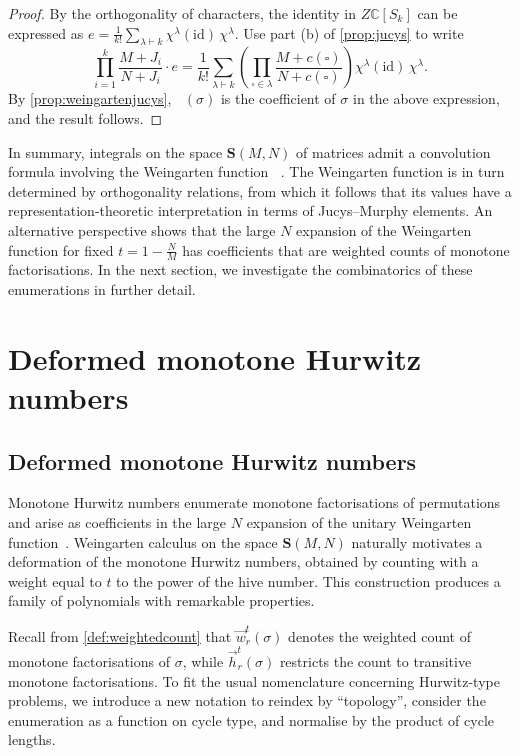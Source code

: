 \documentclass[a4paper]{article}
\theoremstyle{plain}
\numberwithin{theorem}{section}
\theoremstyle{definition}
\theoremstyle{remark}
\newcommand{\SM}{\mathbf{S}}			%
\DeclareMathOperator{\SW}{Wg^{\SM}}		%
\newcommand{\dhn}[2]{\vec{w}^{t}_{#1}(#2)}
\newcommand{\hn}[2]{\vec{h}^{t}_{#1}(#2)}
\begin{document}
\begin{proof}
By the orthogonality of characters, the identity in $Z\mathbb{C}[S_k]$ can be expressed as $e = \frac{1}{k!} \sum_{\lambda \vdash k} \chi^\lambda(\mathrm{id}) \, \chi^\lambda$. Use part (b) of \cref{prop:jucys} to write
\[
\prod_{i=1}^k \frac{M+J_i}{N+J_i} \cdot e = \frac{1}{k!} \sum_{\lambda\vdash k} \left( \prod_{\square \in \lambda} \dfrac{M + c(\square)}{N+c(\square)} \right) \chi^{\lambda}(\mathrm{id}) \, \chi^\lambda .
\]
By \cref{prop:weingartenjucys}, $\SW(\sigma)$ is the coefficient of $\sigma$ in the above expression, and the result follows.
\end{proof}


In summary, integrals on the space $\SM(M,N)$ of matrices admit a convolution formula involving the Weingarten function $\SW$. The Weingarten function is in turn determined by orthogonality relations, from which it follows that its values have a representation-theoretic interpretation in terms of Jucys--Murphy elements. An alternative perspective shows that the large $N$ expansion of the Weingarten function for fixed $t = 1 - \frac{N}{M}$ has coefficients that are weighted counts of monotone factorisations. In the next section, we investigate the combinatorics of these enumerations in further detail.



\section{Deformed monotone Hurwitz numbers} \label{sec:monotone}

\subsection{Deformed monotone Hurwitz numbers}

Monotone Hurwitz numbers enumerate monotone factorisations of permutations and arise as coefficients in the large $N$ expansion of the unitary Weingarten function~\cite{gou-gua-nov14}. Weingarten calculus on the space $\SM(M,N)$ naturally motivates a deformation of the monotone Hurwitz numbers, obtained by counting with a weight equal to $t$ to the power of the hive number. This construction produces a family of polynomials with remarkable properties.


Recall from \cref{def:weightedcount} that $\dhn{r}{\sigma}$ denotes the weighted count of monotone factorisations of $\sigma$, while $\hn{r}{\sigma}$ restricts the count to transitive monotone factorisations. To fit the usual nomenclature concerning Hurwitz-type problems, we introduce a new notation to reindex by ``topology'', consider the enumeration as a function on cycle type, and normalise by the product of cycle lengths.
\end{document}
